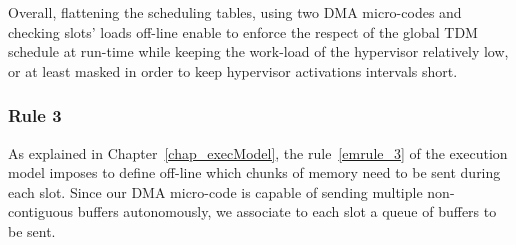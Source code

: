 \documentclass[main.tex]{subfiles}
\begin{document}
\begin{description}
\end{description}

Overall, flattening the scheduling tables, using two DMA micro-codes and checking \PC{} slots' loads off-line enable to enforce the respect of the global TDM schedule at run-time while keeping the work-load of the hypervisor relatively low, or at least masked in order to keep hypervisor activations intervals short.


\subsubsection{Rule 3}
\label{sssec_implemExecModel_repectRule3}
As explained in Chapter~\ref{chap_execModel}, the rule~\ref{emrule_3} of the execution model imposes to define off-line which chunks of memory need to be sent during each \PC{} slot. Since our DMA micro-code is capable of sending multiple non-contiguous buffers autonomously, we associate to each \PC{} slot a queue of buffers to be sent.
\end{document}
